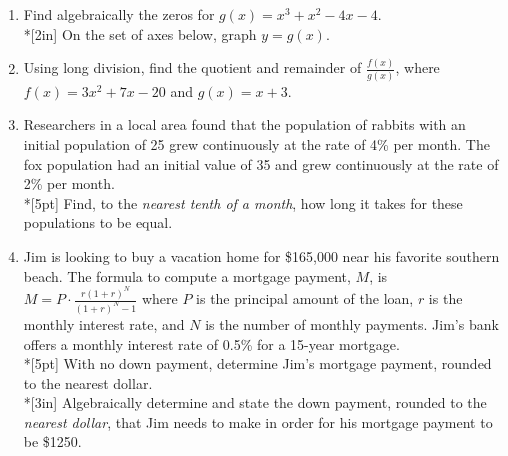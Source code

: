 \documentclass[12pt, oneside]{article}
\begin{document}
\begin{enumerate}
\newpage
\item Find algebraically the zeros for  $g(x)=x^3+x^2-4x-4$.\\*[2in]
On the set of axes below, graph $y=g(x)$.
\begin{center}
\end{center} %



\newpage
\item Using long division, find the quotient and remainder of $\displaystyle \frac{f(x)}{g(x)}$, where $f(x)=3x^2+7x-20$ and $g(x)=x+3$. \\[3in] %


\item Researchers in a local area found that the population of rabbits with an initial population of 25 grew continuously at the rate of 4\% per month. The fox population had an initial value of 35 and grew continuously at the rate of 2\% per month.\\*[5pt]
Find, to the \emph{nearest tenth of a month}, how long it takes for these populations to be equal. \\[3in] %

\newpage

\item Jim is looking to buy a vacation home for \$165,000 near his favorite southern beach. The formula to compute a mortgage payment, $M$, is $\displaystyle M=P \cdot \frac{r(1+r)^N}{(1+r)^N-1}$ where $P$ is the principal amount of the loan, $r$ is the monthly interest rate, and $N$ is the number of monthly payments. Jim’s bank offers a monthly interest rate of 0.5\% for a 15-year mortgage.\\*[5pt]
With no down payment, determine Jim’s mortgage payment, rounded to the nearest dollar.\\*[3in]
Algebraically determine and state the down payment, rounded to the \emph{nearest dollar}, that Jim needs to make in order for his mortgage payment to be \$1250.



\end{enumerate}
\end{document}
